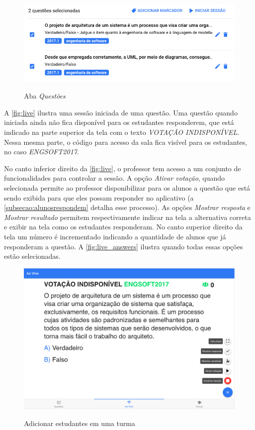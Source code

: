 \begin{figure}[ht]
  \centering
  \caption{Aba \textit{Questões}}
  \includegraphics[scale=.50]{imagens/telas/session_details}
  \doautor
  \label{fig:session_details}
\end{figure}

A \autoref{fig:live} ilustra uma sessão iniciada de uma questão. Uma questão quando
iniciada ainda não fica disponível para os estudantes responderem, que está indicado
na parte superior da tela com o texto \textit{VOTAÇÃO INDISPONÍVEL}. Nessa mesma parte,
o código para acesso da sala fica visível para os estudantes, no caso \textit{ENGSOFT2017}.

No canto inferior direito da \autoref{fig:live}, o professor tem acesso a um conjunto de
funcionalidades para controlar a sessão. A opção \textit{Ativar votação}, quando selecionada
permite ao professor disponibilizar para os alunos a questão que está sendo exibida para que
eles possam responder no aplicativo (a \autoref{subsecao:alunosrespondem} detalha esse processo).
As opções \textit{Mostrar resposta} e \textit{Mostrar resultado} permitem respectivamente indicar
na tela a alternativa correta e exibir na tela como os estudantes responderam.
No canto superior direito da tela um número é incrementado indicando a quantidade de 
alunos que já responderam a questão. A \autoref{fig:live_answers} ilustra quando
todas essas opções estão selecionadas.

\begin{figure}[ht]
  \centering
  \caption{Adicionar estudantes em uma turma}
  \includegraphics[scale=.4]{imagens/telas/live}
  \doautor
  \label{fig:live}
\end{figure}

